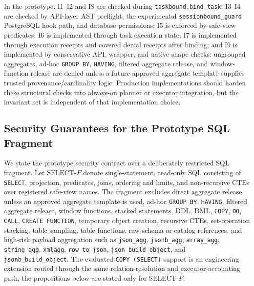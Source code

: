\documentclass[journal]{IEEEtran}
\begin{document}
In the prototype, I1--I2 and I8 are checked during
\texttt{taskbound.bind\_task}; I3--I4 are checked by API-layer AST
preflight, the experimental \texttt{sessionbound\_guard} PostgreSQL
hook path, and database permissions; I5 is enforced by safe-view
predicates; I6 is implemented through task execution state; I7 is
implemented through execution receipts and covered denial receipts after
binding; and I9
is implemented by conservative API, wrapper, and native shape checks:
ungrouped aggregates, ad-hoc \texttt{GROUP\ BY}, \texttt{HAVING},
filtered aggregate release, and window-function release are denied unless a future approved aggregate
template supplies trusted provenance/cardinality logic. Production implementations
should harden these structural checks into always-on planner or executor
integration, but the invariant set is independent of that implementation
choice.

\hypertarget{security-guarantees-for-the-prototype-sql-fragment}{%
\subsection{Security Guarantees for the Prototype SQL
Fragment}\label{security-guarantees-for-the-prototype-sql-fragment}}

We state the prototype security contract over a deliberately restricted
SQL fragment. Let \(\mathrm{SELECT}\text{-}F\) denote single-statement,
read-only SQL consisting of \texttt{SELECT}, projection, predicates,
joins, ordering and limits, and non-recursive CTEs over registered
safe-view names. The fragment excludes direct aggregate release unless
an approved aggregate template is used, ad-hoc \texttt{GROUP\ BY},
\texttt{HAVING}, filtered aggregate release, window functions, stacked
statements, DDL, DML,
\texttt{COPY}, \texttt{DO}, \texttt{CALL}, \texttt{CREATE\ FUNCTION},
temporary object creation, recursive CTEs, set-operation stacking,
table sampling, table functions, raw-schema or catalog references, and
high-risk payload aggregation such as \texttt{json\_agg},
\texttt{jsonb\_agg}, \texttt{array\_agg}, \texttt{string\_agg},
\texttt{xmlagg},
\texttt{row\_to\_json}, \texttt{json\_build\_object}, and
\texttt{jsonb\_build\_object}. The evaluated \texttt{COPY (SELECT)}
support is an engineering extension routed through the same
relation-resolution and executor-accounting path; the propositions below
are stated only for \(\mathrm{SELECT}\text{-}F\).
\end{document}
